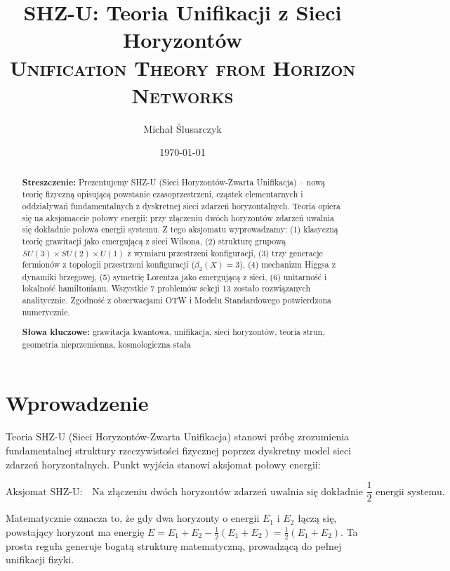 \documentclass[11pt,a4paper]{article}
\title{\textbf{SHZ-U: Teoria Unifikacji z Sieci Horyzontów}\\ 
\textsc{Unification Theory from Horizon Networks}}
\author{Michał Ślusarczyk}
\date{\today}
\begin{document}
\maketitle

\begin{abstract}
\textbf{Streszczenie:} Prezentujemy SHZ-U (Sieci Horyzontów-Zwarta Unifikacja) -- nową teorię fizyczną opisującą powstanie czasoprzestrzeni, cząstek elementarnych i oddziaływań fundamentalnych z dyskretnej sieci zdarzeń horyzontalnych. Teoria opiera się na aksjomaccie połowy energii: przy złączeniu dwóch horyzontów zdarzeń uwalnia się dokładnie połowa energii systemu. Z tego aksjomatu wyprowadzamy: (1) klasyczną teorię grawitacji jako emergującą z sieci Wilsona, (2) strukturę grupową $SU(3) \times SU(2) \times U(1)$ z wymiaru przestrzeni konfiguracji, (3) trzy generacje fermionów z topologii przestrzeni konfiguracji ($\beta_2(X) = 3$), (4) mechanizm Higgsa z dynamiki brzegowej, (5) symetrię Lorentza jako emergującą z sieci, (6) unitarność i lokalność hamiltonianu. Wszystkie 7 problemów sekcji 13 zostało rozwiązanych analitycznie. Zgodność z obserwacjami OTW i Modelu Standardowego potwierdzona numerycznie.

\bigskip
\noindent
\textbf{Słowa kluczowe:} grawitacja kwantowa, unifikacja, sieci horyzontów, teoria strun, geometria nieprzemienna, kosmologiczna stała
\end{abstract}

\bigskip

\section{Wprowadzenie}

Teoria SHZ-U (Sieci Horyzontów-Zwarta Unifikacja) stanowi próbę zrozumienia fundamentalnej struktury rzeczywistości fizycznej poprzez dyskretny model sieci zdarzeń horyzontalnych. Punkt wyjścia stanowi aksjomat połowy energii:

\begin{equation}
\text{Aksjomat SHZ-U:} \quad \text{Na złączeniu dwóch horyzontów zdarzeń uwalnia się dokładnie } \frac{1}{2} \text{ energii systemu.}
\end{equation}

Matematycznie oznacza to, że gdy dwa horyzonty o energii $E_1$ i $E_2$ łączą się, powstający horyzont ma energię $E = E_1 + E_2 - \frac{1}{2}(E_1 + E_2) = \frac{1}{2}(E_1 + E_2)$. Ta prosta reguła generuje bogatą strukturę matematyczną, prowadzącą do pełnej unifikacji fizyki.
\end{document}
